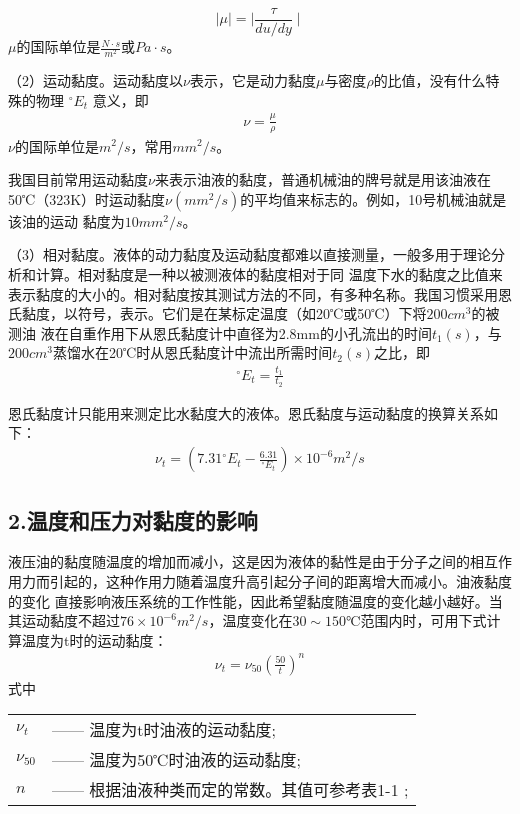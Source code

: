
$$\mid{\mu}\mid=\mid{\frac{\tau}{du/dy}}\mid$$
\noindent${\mu}$的国际单位是${\frac{N \cdot s}{m^2}}$或${Pa \cdot s}$。

（2）运动黏度。运动黏度以${\nu}$表示，它是动力黏度${\mu}$与密度${\rho}$的比值，没有什么特殊的物理    ${{ }^{\circ }}{{E}_{t}}$
意义，即
\begin{gather}
    {\nu}={\frac{\mu}{\rho}}
\end{gather}
   \noindent${\nu}$的国际单位是$m^2/s$，常用$mm^2/s$。

    我国目前常用运动黏度${\nu}$来表示油液的黏度，普通机械油的牌号就是用该油液在
50℃（323K）时运动黏度${\nu}(mm^2/s)$的平均值来标志的。例如，10号机械油就是该油的运动
黏度为$10mm^2/s$。

（3）相对黏度。液体的动力黏度及运动黏度都难以直接测量，一般多用于理论分析和计算。相对黏度是一种以被测液体的黏度相对于同
温度下水的黏度之比值来表示黏度的大小的。相对黏度按其测试方法的不同，有多种名称。我国习惯采用恩氏黏度，以符号，表示。它们是在某标定温度（如20℃或50℃）下将$200cm^3$的被测油
液在自重作用下从恩氏黏度计中直径为2.8mm的小孔流出的时间${{t}_{1}}{ (s) }$，与$200cm^3$蒸馏水在20℃时从恩氏黏度计中流出所需时间${{t}_{2}}{(s) }$之比，即
\begin{gather}
    {{ }^{\circ }}{{E}_{t}}=\frac{{{t}_{1}}}{{{t}_{2}}}
\end{gather}

恩氏黏度计只能用来测定比水黏度大的液体。恩氏黏度与运动黏度的换算关系如下：
\begin{gather}
    {\nu_{t}}= (7.31{{ }^{\circ }}{{E}_{t}}-{ \frac  {6.31}   {{ }^{\circ } {{E}_{t}} }} )×{10^{-6}}m^2/s
\end{gather}
\subsection*{2.温度和压力对黏度的影响}

液压油的黏度随温度的增加而减小，这是因为液体的黏性是由于分子之间的相互作用力而引起的，这种作用力随着温度升高引起分子间的距离增大而减小。油液黏度的变化
直接影响液压系统的工作性能，因此希望黏度随温度的变化越小越好。当其运动黏度不超过$76×{10^{-6}}m^2/s$，温度变化在$30\sim150℃$范围内时，可用下式计算温度为t时的运动黏度：
\begin{gather}
    {\nu_{t}}={\nu_{50}} ( {\frac{50}{t}}) ^{n} 
\end{gather}
    \noindent 式中\ 
    \begin{tabular}[t]{ll}
        ${\nu_{t}}$ & —— 温度为t时油液的运动黏度;\\
        ${\nu_{50}}$ & —— 温度为50℃时油液的运动黏度;\\
        ${n}$ & —— 根据油液种类而定的常数。其值可参考表1-1 ;
    \end{tabular}

